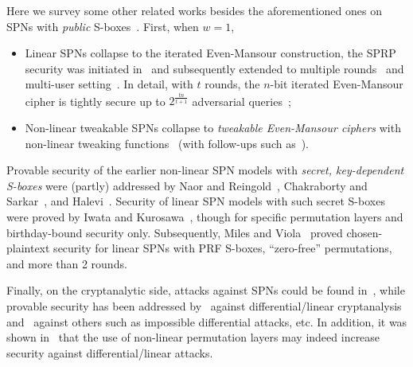 Here we survey some other related works besides the aforementioned ones on SPNs with {\it public} S-boxes~\cite{EC:DSSL16,EPRINT:DKSTZ17,EPRINT:CogLee18,C:CDKLST18}. First, when $w=1$,
%
\begin{itemize}
	\item Linear SPNs collapse to the iterated Even-Mansour construction, the SPRP security was initiated in~\cite{JC:EveMan97} and subsequently extended to multiple rounds~\cite{EC:BKLSST12,EPRINT:Steinberger12,AC:LamPatSeu12,EC:CheSte14,JC:CLLSS18,C:HoaTes16} and multi-user setting~\cite{C:HoaTes16}. In detail, with $t$ rounds, the $n$-bit iterated Even-Mansour cipher is tightly secure up to $2^{\frac{tn}{t+1}}$ adversarial queries~\cite{EC:BKLSST12,EC:CheSte14,C:HoaTes16};
	\item Non-linear tweakable SPNs collapse to {\it tweakable Even-Mansour ciphers} with non-linear tweaking functions~\cite{C:CogLamSeu15} (with follow-ups such as~\cite{AC:CogSeu15,EC:GJMN16,C:Mennink16}).
\end{itemize}
%
Provable security of the earlier non-linear SPN models with {\it secret, key-dependent S-boxes} were (partly) addressed by Naor and Reingold~\cite{JC:NaoRei99}, Chakraborty and Sarkar~\cite{FSE:ChaSar06}, and Halevi~\cite{C:Halevi07}. Security of linear SPN models with such secret S-boxes were proved by Iwata and Kurosawa~\cite{FSE:IwaKur00}, though for specific permutation layers and birthday-bound security only. Subsequently, Miles and Viola~\cite{miles2015substitution} proved chosen-plaintext security for linear SPNs with PRF S-boxes, ``zero-free'' permutations, and more than 2 rounds.


Finally, on the cryptanalytic side, attacks against SPNs could be found in~\cite{EC:Joux03,RSA:HalRog04,JC:BirSha10,AC:BirBouKho14,cryptoeprint:2015:646,cryptoeprint:2015:646}, while provable security has been addressed by~\cite{IMA:DaeRij01,AC:PSCYL02,FSE:PSLL03,miles2015substitution} against differential/linear cryptanalysis and~\cite{EC:SLGRL16} against others such as impossible differential attacks, etc. In addition, it was shown in~\cite{DBLP:journals/dcc/LiuRL18} that the use of non-linear permutation layers may indeed increase security against differential/linear attacks.



